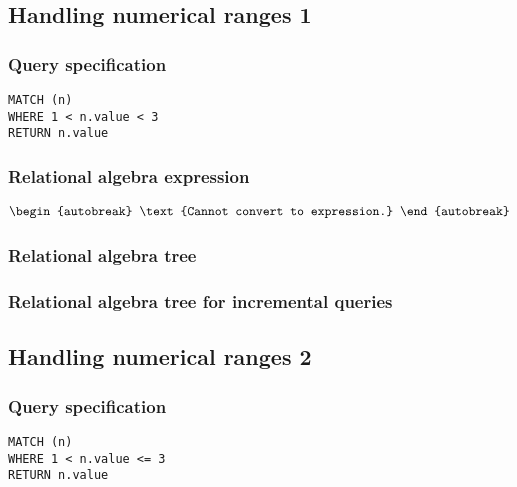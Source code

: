 \subsection{Handling numerical ranges 1}

\subsubsection*{Query specification}

\begin{lstlisting}
MATCH (n)
WHERE 1 < n.value < 3
RETURN n.value
\end{lstlisting}

\subsubsection*{Relational algebra expression}

\begin{align*}
\begin{autobreak}
\text{Cannot convert to expression.}
\end{autobreak}
\end{align*}

\subsubsection*{Relational algebra tree}


\subsubsection*{Relational algebra tree for incremental queries}


\subsection{Handling numerical ranges 2}

\subsubsection*{Query specification}

\begin{lstlisting}
MATCH (n)
WHERE 1 < n.value <= 3
RETURN n.value
\end{lstlisting}

